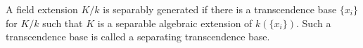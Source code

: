 A field extension $K/k$ is separably generated if there is a transcendence base $\{x_i\}$ for $K/k$ such that $K$ is a separable algebraic extension of $k(\{x_i\})$. Such a transcendence base is called a separating transcendence base.
